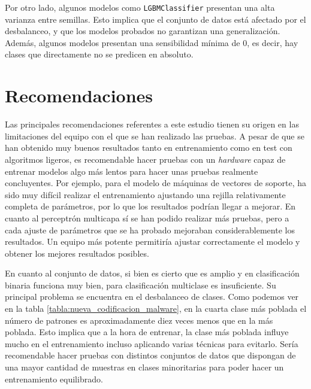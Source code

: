 \vspace{1em}

Por otro lado, algunos modelos como \texttt{LGBMClassifier} presentan una alta varianza entre semillas. Esto implica que el conjunto de datos está afectado por el desbalanceo, y que los modelos probados no garantizan una generalización. Además, algunos modelos presentan una sensibilidad mínima de 0, es decir, hay clases que directamente no se predicen en absoluto.

\section{Recomendaciones}
\label{sec:recomendaciones}

Las principales recomendaciones referentes a este estudio tienen su origen en las limitaciones del equipo con el que se han realizado las pruebas. A pesar de que se han obtenido muy buenos resultados tanto en entrenamiento como en test con algoritmos ligeros, es recomendable hacer pruebas con un \textit{hardware} capaz de entrenar modelos algo más lentos para hacer unas pruebas realmente concluyentes. Por ejemplo, para el modelo de máquinas de vectores de soporte, ha sido muy difícil realizar el entrenamiento ajustando una rejilla relativamente completa de parámetros, por lo que los resultados podrían llegar a mejorar. En cuanto al perceptrón multicapa sí se han podido realizar más pruebas, pero a cada ajuste de parámetros que se ha probado mejoraban considerablemente los resultados. Un equipo más potente permitiría ajustar correctamente el modelo y obtener los mejores resultados posibles.

\vspace{1em}

En cuanto al conjunto de datos, si bien es cierto que es amplio y en clasificación binaria funciona muy bien, para clasificación multiclase es insuficiente. Su principal problema se encuentra en el desbalanceo de clases. Como podemos ver en la tabla \ref{tabla:nueva_codificacion_malware}, en la cuarta clase más poblada el número de patrones es aproximadamente diez veces menos que en la más poblada. Esto implica que a la hora de entrenar, la clase más poblada influye mucho en el entrenamiento incluso aplicando varias técnicas para evitarlo. Sería recomendable hacer pruebas con distintos conjuntos de datos que dispongan de una mayor cantidad de muestras en clases minoritarias para poder hacer un entrenamiento equilibrado.

